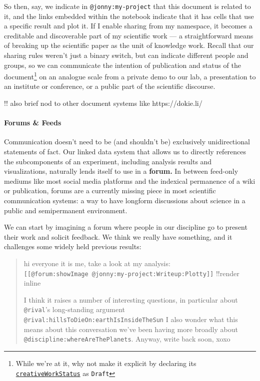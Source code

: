 \documentclass[10pt]{tufte-book}
\begin{document}
So then, say, we indicate in \texttt{@jonny:my-project} that this
document is related to it, and the links embedded within the notebook
indicate that it has cells that use a specific result and plot it. If I
enable sharing from my namespace, it becomes a creditable and
discoverable part of my scientific work --- a straightforward means of
breaking up the scientific paper as the unit of knowledge work. Recall
that our sharing rules weren't just a binary switch, but can indicate
different people and groups, so we can communicate the intention of
publication and status of the document\footnote{While we're at it, why
  not make it explicit by declaring its
  \href{https://schema.org/creativeWorkStatus}{\texttt{creativeWorkStatus}}
  as \texttt{Draft}} on an analogue scale from a private demo to our
lab, a presentation to an institute or conference, or a public part of
the scientific discourse.

!! also brief nod to other document systems like https://dokie.li/


\paragraph{Forums \& Feeds}

Communication doesn't need to be (and shouldn't be) exclusively
unidirectional statements of fact. Our linked data system that allows us
to directly references the subcomponents of an experiment, including
analysis results and visualizations, naturally lends itself to use in a
\textbf{forum.} In between feed-only mediums like most social media
platforms and the indexical permanence of a wiki or publication, forums
are a currently missing piece in most scientific communication systems:
a way to have longform discussions about science in a public and
semipermanent environment.

We can start by imagining a forum where people in our discipline go to
present their work and solicit feedback. We think we really have
something, and it challenges some widely held previous results:

\begin{quote}
hi everyone it is me, take a look at my analysis:
\texttt{{[}{[}@forum:showImage\ @jonny:my-project:Writeup:Plotty{]}{]}}
!!render inline

I think it raises a number of interesting questions, in particular about
\texttt{@rival}'s long-standing argument
\texttt{@rival:hillsToDieOn:earthIsInsideTheSun} I also wonder what this
means about this conversation we've been having more broadly about
\texttt{@discipline:whereAreThePlanets}. Anyway, write back soon, xoxo
\end{quote}
\end{document}
